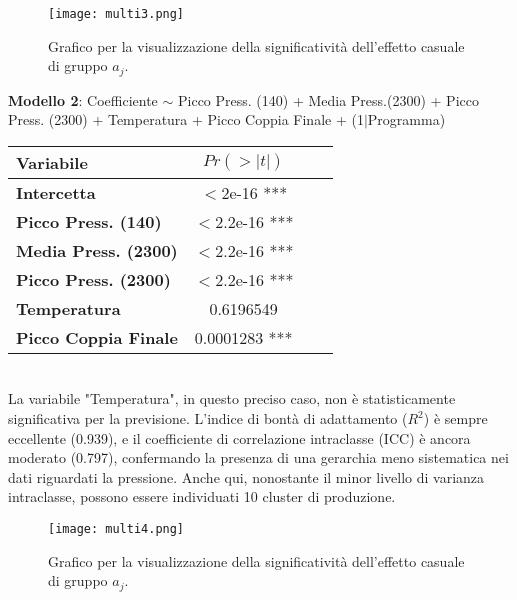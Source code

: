 \documentclass[fleqn,10pt]{SelfArx} %
\begin{document}
\begin{figure}[H]
    \centering
    \texttt{[image: multi3.png]}
    \label{fig:em}
    \caption{Grafico per la visualizzazione della significatività dell'effetto casuale di gruppo $a_j$.}
\end{figure}
\textbf{Modello 2}: Coefficiente $\sim$  Picco Press. (140) + Media Press.(2300) + Picco Press. (2300) + Temperatura + Picco Coppia Finale + (1$\mid$Programma)
{\begin{table}[h] 
\centering
\begin{tabular}[t]{lccc}
\toprule 
Variabile&$Pr(> |t|)$\\
\midrule 
\textbf{Intercetta}&$<$2e-16 ***&\\
\textbf{Picco Press. (140)}&$<$2.2e-16 ***\\ 
\textbf{Media Press. (2300)}&$<$2.2e-16 ***\\ 
\textbf{Picco Press. (2300)}&$<$2.2e-16 ***\\ 
\textbf{Temperatura}&0.6196549\\
\textbf{Picco Coppia Finale}&0.0001283 ***\\
\bottomrule 
\end{tabular}
\end{table}}\\
La variabile "Temperatura", in questo preciso caso, non è statisticamente significativa per la previsione. L'indice di bontà di adattamento ($R^2$) è sempre eccellente (0.939), e il coefficiente di correlazione intraclasse (ICC) è ancora moderato (0.797), confermando la presenza di una gerarchia meno sistematica nei dati riguardati la pressione. Anche qui, nonostante il minor livello di varianza intraclasse, possono essere individuati 10 cluster di produzione.
\begin{figure}[H]
    \centering
    \texttt{[image: multi4.png]}
    \label{fig:em}
    \caption{Grafico per la visualizzazione della significatività dell'effetto casuale di gruppo $a_j$.}
\end{figure}
\end{document}
